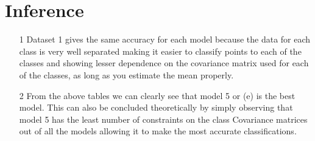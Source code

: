 \documentclass[a4 paper]{article}
\begin{document}
\section{Inference}
\begin{itemize}
\item [1] Dataset 1 gives the same accuracy for each model because the data for each class is very well separated making it easier to classify points to each of the classes and showing lesser dependence on the covariance matrix used for each of the classes, as long as you estimate the mean properly.
\item [2]From the above tables we can clearly see that model 5 or (e) is the best model. This can also be concluded theoretically by simply observing that model 5 has the least number of constraints on the class Covariance matrices out of all the models allowing it to make the most accurate classifications.

\end{itemize}
\newpage
{} 
\end{document}
